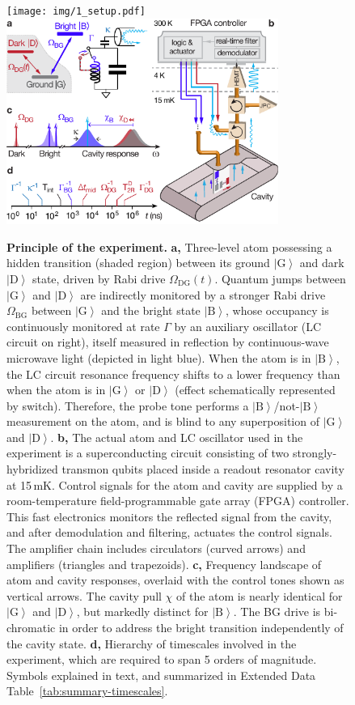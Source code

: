 \documentclass[
	 			preprint,     		superscriptaddress, 																longbibliography,
		amsmath, amssymb,
		aps,  prb,   		floatfix,
		linenumbers     
	]{revtex4-1}
\newcommand{\ket}[1]{\left|#1\right>}
\begin{document}
\begin{figure}[!ht]
\label{fig:setup}
\begin{centering}
\ifjournal
	\texttt{[image: img/1\_setup.pdf]}
\else
	\includegraphics[width=89mm]{1_setup.pdf}
\fi
\caption{
\textbf{Principle of the experiment.} 
\textbf{a,} 
Three-level atom possessing a hidden transition (shaded region) between its ground $\ket{\mathrm{G}}$ and dark $\ket{\mathrm{D}}$ state, driven by Rabi drive $\Omega_\mathrm{DG}(t)$.
Quantum jumps between $\ket{\mathrm{G}}$ and $\ket{\mathrm{D}}$ are indirectly monitored by a stronger Rabi drive $\Omega_\mathrm{BG}$ between $\ket{\mathrm{G}}$ and the bright state $\ket{\mathrm{B}}$, whose occupancy is continuously monitored at rate $\Gamma$ by an auxiliary oscillator (LC circuit on right), itself measured in reflection by  continuous-wave microwave light (depicted in light blue). 
When the atom is in $\ket{\mathrm{B}}$,  the LC circuit resonance frequency shifts to a lower frequency than when the atom is in $\ket{\mathrm{G}}$ or $\ket{\mathrm{D}}$ (effect schematically represented by switch). 
Therefore, the probe tone performs a $\ket{\mathrm{B}}$/not-$\ket{\mathrm{B}}$ measurement on the atom, and is blind to any superposition of  $\ket{\mathrm{G}}$ and $\ket{\mathrm{D}}$.
\textbf{b,}  
The actual atom and LC oscillator used in the experiment is a superconducting circuit consisting of two strongly-hybridized transmon qubits placed inside a readout resonator cavity at 15\,mK.
Control signals for the atom and cavity are supplied by a room-temperature field-programmable gate array (FPGA) controller.
This fast electronics  monitors the reflected signal from the cavity, and after demodulation and filtering, actuates the control signals.
The amplifier chain includes circulators (curved arrows) and amplifiers (triangles and trapezoids).
\textbf{c,}  
Frequency landscape of atom and cavity responses, overlaid with the control tones shown as vertical arrows.
The cavity pull $\chi$ of the atom is nearly identical for $\ket{\mathrm{G}}$ and $\ket{\mathrm{D}}$, but  markedly distinct for $\ket{\mathrm{B}}$.
The BG drive is bi-chromatic in order to address the bright transition independently of the cavity state. \textbf{d,} Hierarchy of timescales involved in the experiment, which are required to span 5 orders of magnitude. Symbols explained in text,  and  summarized in Extended Data Table~\ref{tab:summary-timescales}.
}
\end{centering}
\end{figure}
\end{document}
